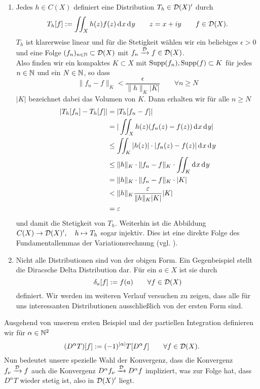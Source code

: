 \begin{bsp}
  \begin{enumerate}
  \item Jedes $h \in C(X)$ definiert eine Distribution $T_h \in
    \mathcal{D}(X)'$ durch
    \[
    T_h[f] := \iint_X h(z) f(z) \d[x]\d[y] \qquad z = x+iy \qquad f
    \in \dist(X).
    \]
    $T_h$ ist klarerweise linear und für die Stetigkeit wählen wir ein
    beliebiges $\epsilon > 0$ und eine Folge $(f_n)_{n \in\mathbb{N}} \subset
    \mathcal{D}(X)$ mit $f_n \xrightarrow{\mathcal{D}} f \in \mathcal{D}(X)$. \\
    Also finden wir ein kompaktes $K \subset X$ mit $\operatorname{Supp}(f_n),
    \operatorname{Supp}(f) \subset K$ für jedes $n \in \mathbb{N}$ und ein $N \in \mathbb{N}$, so
    dass
    \[
    \|f_n -f\|_K < \frac{\epsilon}{\|h\|_K |K|} \qquad \forall n \geq N
    \]
    $|K|$ bezeichnet dabei das Volumen von $K$. Dann erhalten wir für
    alle $n \geq N$
    \begin{align*}
      |T_h[f_n] - T_h[f]| & = | T_h[f_n -f]| \\
      & = | \iint_X h(z) (f_n(z) - f(z)) \d[x]\d[y]| \\
      & \leq \iint_K |h(z)| \cdot |f_n(z) - f(z)| \d[x]\d[y]\\
      & \leq \|h\|_K \cdot\|f_n - f\|_K \cdot \iint_K \d[x] \d[y] \\
      & = \|h\|_K \cdot \|f_n - f\|_K \cdot |K| \\
      & < \|h\|_K \frac{\epsilon}{\|h\|_K |K|} |K| \\
      & = \epsilon
    \end{align*}
    und damit die Stetigkeit von $T_h$.
    Weiterhin ist die Abbildung $C(X) \rightarrow \mathcal{D}(X)', \quad h \mapsto
    T_h$ sogar injektiv. Dies ist eine direkte Folge des 
    Fundamentallemmas der Variationsrechnung (vgl. \cite[§10 HS3]{ForAna}).
  \item Nicht alle Distributionen sind von der obigen Form. Ein
    Gegenbeispiel stellt die Diracsche Delta Distribution dar. Für ein
    $a \in X$ ist sie durch
    \[
    \delta_a[f] := f(a) \qquad \forall f \in \mathcal{D}(X)
    \]
    definiert. Wir werden im weiteren Verlauf versuchen
    zu zeigen, dass alle für uns interessanten Distributionen
    ausschließlich von der
    ersten Form sind.
  \end{enumerate}
\end{bsp}

\begin{defin} 
  Ausgehend von unserem ersten Beispiel und der partiellen Integration
  definieren wir für $\alpha \in \mathbb{N}^2$
  \[
  (D^\alpha T)[f] := (-1)^{|\alpha|} T[D^\alpha f] \qquad \forall f
  \in \mathcal{D}(X).
  \]
  Nun bedeutet unsere spezielle Wahl der Konvergenz, dass die
  Konvergenz $f_\nu \xrightarrow{\mathcal{D}} f$ auch die Konvergenz
  $D^\alpha f_\nu \xrightarrow{\mathcal{D}} D^\alpha f$ impliziert, was zur
  Folge hat, dass $D^\alpha T$ wieder stetig ist, also in $\mathcal{D}(X)'$ liegt.
\end{defin}

